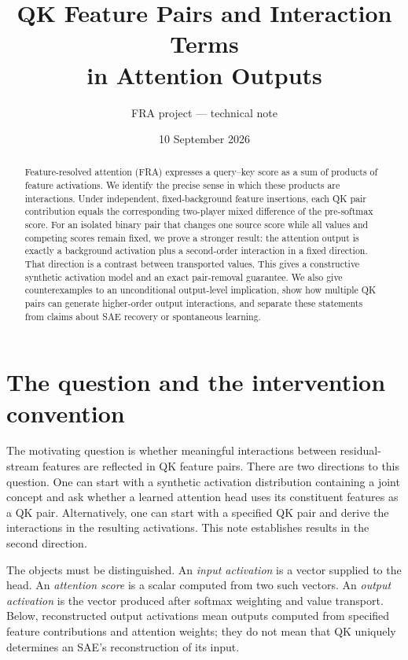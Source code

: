 \documentclass[11pt]{article}
\title{QK Feature Pairs and Interaction Terms\\in Attention Outputs}
\author{FRA project --- technical note}
\date{10 September 2026}
\theoremstyle{plain}
\theoremstyle{definition}
\theoremstyle{remark}
\begin{document}
\maketitle
\thispagestyle{empty}

\begin{abstract}
Feature-resolved attention (FRA) expresses a query--key score as a sum of products of feature activations. We identify the precise sense in which these products are interactions. Under independent, fixed-background feature insertions, each QK pair contribution equals the corresponding two-player mixed difference of the pre-softmax score. For an isolated binary pair that changes one source score while all values and competing scores remain fixed, we prove a stronger result: the attention output is exactly a background activation plus a second-order interaction in a fixed direction. That direction is a contrast between transported values. This gives a constructive synthetic activation model and an exact pair-removal guarantee. We also give counterexamples to an unconditional output-level implication, show how multiple QK pairs can generate higher-order output interactions, and separate these statements from claims about SAE recovery or spontaneous learning.
\end{abstract}

\section{The question and the intervention convention}

The motivating question is whether meaningful interactions between residual-stream features are reflected in QK feature pairs. There are two directions to this question. One can start with a synthetic activation distribution containing a joint concept and ask whether a learned attention head uses its constituent features as a QK pair. Alternatively, one can start with a specified QK pair and derive the interactions in the resulting activations. This note establishes results in the second direction.

The objects must be distinguished. An \emph{input activation} is a vector supplied to the head. An \emph{attention score} is a scalar computed from two such vectors. An \emph{output activation} is the vector produced after softmax weighting and value transport. Below, reconstructed output activations mean outputs computed from specified feature contributions and attention weights; they do not mean that QK uniquely determines an SAE's reconstruction of its input.
\end{document}
